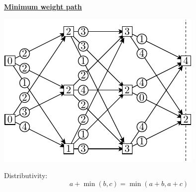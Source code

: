 \documentclass[11pt]{article}
\def\heading #1{\centerline{\underline{\bf\LARGE #1}}}
\begin{document}
\newpage %

\heading{Minimum weight path}
\centerline{\includegraphics[]{pic-minpath-4.pdf}}

Distributivity:
$$
    a + \min(b, c) = \min(a+b, a+c)
$$
\end{document}
